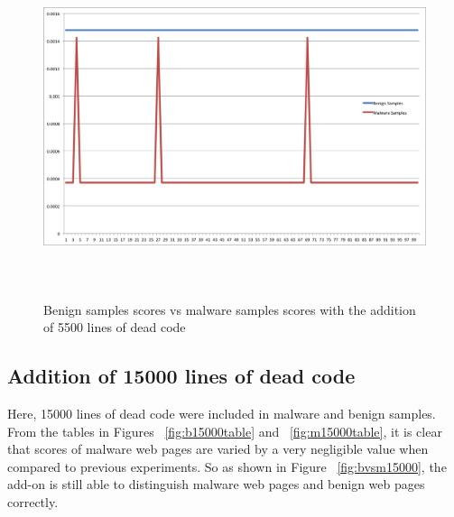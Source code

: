 \begin{figure}[h]
    \centering    
    \includegraphics[width=16cm, height=10cm]{5000.png}
    \caption[Benign Samples vs Malware Samples]{Benign samples scores vs malware samples scores with the addition of 5500 lines of dead code}
    \label{fig:bvsm5500}
\end{figure}

\subsection{Addition of 15000 lines of dead code}
Here, 15000 lines of dead code were included in malware and benign samples. From the tables in Figures ~\ref{fig:b15000table} and  ~\ref{fig:m15000table}, it is clear that scores of malware web pages are varied by a very negligible value when compared to previous experiments. So as shown in Figure ~\ref{fig:bvsm15000}, the add-on is still able to distinguish malware web pages and benign web pages correctly.

